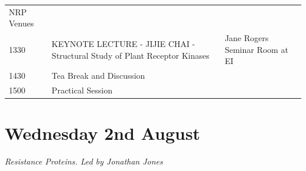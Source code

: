 \documentclass[12pt,]{book}
\theoremstyle{definition}
\theoremstyle{definition}
\theoremstyle{remark}
\begin{document}
\begin{longtable}[]{@{}lll@{}}
\begin{minipage}[t]{0.39\columnwidth}
NRP Venues\strut
\end{minipage}\tabularnewline
\begin{minipage}[t]{0.09\columnwidth}\raggedright\strut
1330\strut
\end{minipage} & \begin{minipage}[t]{0.39\columnwidth}\raggedright\strut
KEYNOTE LECTURE - JIJIE CHAI - Structural Study of Plant Receptor
Kinases\strut
\end{minipage} & \begin{minipage}[t]{0.39\columnwidth}\raggedright\strut
Jane Rogers Seminar Room at EI\strut
\end{minipage}\tabularnewline
\begin{minipage}[t]{0.09\columnwidth}\raggedright\strut
1430\strut
\end{minipage} & \begin{minipage}[t]{0.39\columnwidth}\raggedright\strut
Tea Break and Discussion\strut
\end{minipage} & \begin{minipage}[t]{0.39\columnwidth}\raggedright\strut
\strut
\end{minipage}\tabularnewline
\begin{minipage}[t]{0.09\columnwidth}\raggedright\strut
1500\strut
\end{minipage} & \begin{minipage}[t]{0.39\columnwidth}\raggedright\strut
Practical Session\strut
\end{minipage} & \begin{minipage}[t]{0.39\columnwidth}\raggedright\strut
\strut
\end{minipage}\tabularnewline
\bottomrule
\end{longtable}

\section*{Wednesday 2nd August}\label{wednesday-2nd-august}

\emph{Resistance Proteins. Led by Jonathan Jones}
\end{document}
